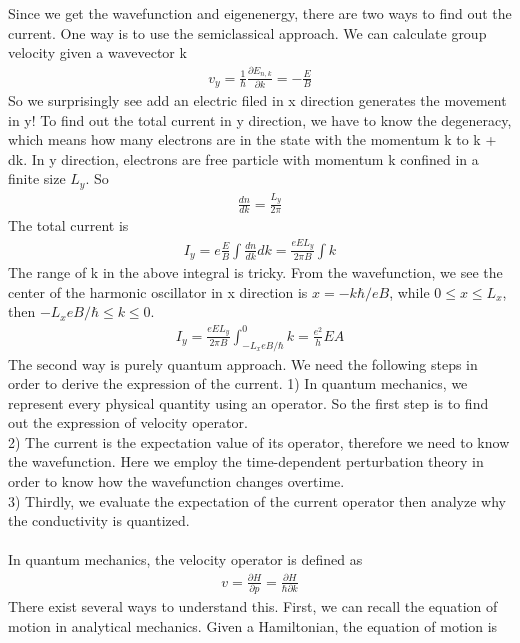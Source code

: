\documentclass[a4paper]{article}
\begin{document}
Since we get the wavefunction and eigenenergy, there are two ways to find out the current. One way is to use the semiclassical approach. We can calculate group velocity given a wavevector k
\begin{align*}
	v_y = \frac{1}{\hbar} \frac{\partial E_{n,k}}{\partial k} = -\frac{E}{B}
\end{align*}
So we surprisingly see add an electric filed in x direction generates the movement in y!
To find out the total current in y direction, we have to know the degeneracy, which means how many electrons are in the state with the momentum k to k + dk. In y direction, electrons are free particle with momentum k confined in a finite size $L_y$. So
\begin{align*}
	\frac{dn}{dk} = \frac{L_y}{2 \pi}
\end{align*}
The total current is
\begin{align*}
	I_y = e \frac{E}{B} \int \frac{dn}{dk}dk = \frac{eEL_y}{2\pi B} \int k
\end{align*}
The range of k in the above integral is tricky. From the wavefunction, we see the center of the harmonic oscillator in x direction is $x = -k\hbar/eB$, while $ 0 \leq x \leq L_x$, then $-L_x eB/\hbar  \leq k \leq 0$.
\begin{align*}
	I_y = \frac{eEL_y}{2\pi B} \int_{-L_xeB/\hbar}^0 k = \frac{e^2}{h}EA
\end{align*}
The second way is purely quantum approach. We need the following steps in order to derive the expression of the current. 
1) In quantum mechanics, we represent every physical quantity using an operator. So the first step is to find out the expression of velocity operator. \\
2) The current is the expectation value of its operator, therefore we need to know the wavefunction. Here we employ the time-dependent perturbation theory in order to know how the wavefunction changes overtime.\\
3) Thirdly, we evaluate the expectation of the current operator then analyze why the conductivity is quantized.\\
\\
In quantum mechanics, the velocity operator is defined as
\begin{align*}
	v = \frac{\partial H}{\partial p} = \frac{\partial H}{ \hbar \partial k}
\end{align*}
There exist several ways to understand this. First, we can recall the equation of motion in analytical mechanics. Given a Hamiltonian, the equation of motion is
\end{document}
